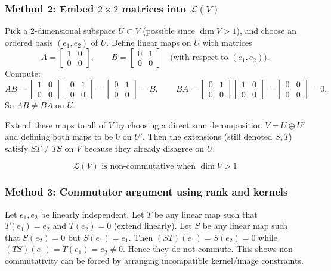 \documentclass[12pt]{article}
\newcommand{\cL}{\mathcal{L}}
\begin{document}
\subsubsection{Method 2: Embed $2\times 2$ matrices into $\cL(V)$}
Pick a 2-dimensional subspace $U\subset V$ (possible since $\dim V>1$), and choose an ordered basis $(e_1,e_2)$ of $U$.
Define linear maps on $U$ with matrices
\[
A=\begin{bmatrix}1&0\\0&0\end{bmatrix},
\qquad
B=\begin{bmatrix}0&1\\0&0\end{bmatrix}
\quad\text{(with respect to }(e_1,e_2)\text{)}.
\]
Compute:
\[
AB=
\begin{bmatrix}1&0\\0&0\end{bmatrix}
\begin{bmatrix}0&1\\0&0\end{bmatrix}
=
\begin{bmatrix}0&1\\0&0\end{bmatrix}
=B,
\qquad
BA=
\begin{bmatrix}0&1\\0&0\end{bmatrix}
\begin{bmatrix}1&0\\0&0\end{bmatrix}
=
\begin{bmatrix}0&0\\0&0\end{bmatrix}
=0.
\]
So $AB\neq BA$ on $U$.

Extend these maps to all of $V$ by choosing a direct sum decomposition $V=U\oplus U'$ and defining both maps to be $0$ on $U'$.
Then the extensions (still denoted $S,T$) satisfy $ST\neq TS$ on $V$ because they already disagree on $U$.

\[
\boxed{\,\cL(V)\text{ is non-commutative when }\dim V>1\,}
\]

\subsubsection{Method 3: Commutator argument using rank and kernels}
Let $e_1,e_2$ be linearly independent.
Let $T$ be any linear map such that $T(e_1)=e_2$ and $T(e_2)=0$ (extend linearly).
Let $S$ be any linear map such that $S(e_2)=0$ but $S(e_1)=e_1$.
Then $(ST)(e_1)=S(e_2)=0$ while $(TS)(e_1)=T(e_1)=e_2\neq 0$. Hence they do not commute.
This shows non-commutativity can be forced by arranging incompatible kernel/image constraints.
\end{document}
